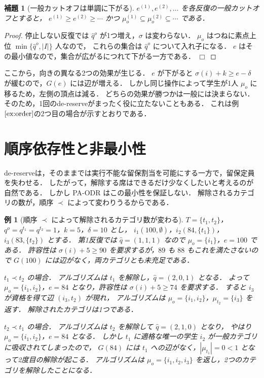\documentclass[
    12pt,          %
    a4paper,       %
    oneside,       %
    onecolumn,     %
    titlepage,     %
    final          %
]{jreport} %
\newcommand{\refexample}[1]{例 $\ref{#1}$}
\newtheorem{example}{例}[chapter]
\newtheorem{lemma}{補題}[chapter]
\newtheorem{proof}{証明}[chapter]
\newcommand{\qed}{\hfill $\Box$ \par}
\begin{document}
\begin{lemma}[一般カットオフは単調に下がる]
\label{lem:monotone}
$e^{(1)},e^{(2)},\dots$ を各反復の一般カットオフとすると，
$e^{(1)}\ge e^{(2)}\ge\cdots$ かつ $\mu_o^{(1)}\subseteq\mu_o^{(2)}\subseteq\cdots$ である．
\end{lemma}

\begin{proof}
停止しない反復では $\hat q^o$ が1つ増え，$\sigma$ は変わらない．
$\mu_o$ はつねに素点上位 $\min\{\hat q^o,|I|\}$ 人なので，
これらの集合は $\hat q^o$ について入れ子になる．
$e$ はその最小値なので，集合が広がるにつれて下がる一方である．
\qed
\end{proof}

ここから，向きの異なる2つの効果が生じる．
$e$ が下がると $\sigma(i)+k\ge e-\delta$ が緩むので，$G(e)$ には辺が増える．
しかし同じ操作によって学生が1人 $\mu_o$ に移るため，左側の頂点は減る．
どちらの効果が勝つかは一般には決まらない．
そのため，1回のde-reserveがまったく役に立たないこともある．
これは\refexample{ex:order}の2つ目の場合が示すとおりである．

\section{順序依存性と非最小性}
\label{sec:order}

de-reserveは，そのままでは実行不能な留保割当を可能にする一方で，留保定員を失わせる．
したがって，解除する席はできるだけ少なくしたいと考えるのが自然である．
しかし PA-ODR はこの最小性を保証しない．
解除されるカテゴリの数が，順序 $\prec$ によって変わりうるからである．

\begin{example}[順序 $\prec$ によって解除されるカテゴリ数が変わる]
\label{ex:order}
$T=\{t_1,t_2\}$，$q^o=q^{t_1}=q^{t_2}=1$，$k=5$，$\delta=10$ とし，
$i_1(100,\emptyset)$，$i_2(84,\{t_1\})$，$i_3(83,\{t_2\})$ とする．
第1反復では $\hat q=(1,1,1)$ なので $\mu_o=\{i_1\}$，$e=100$ である．
許容性は $\sigma(i)+5\ge90$ を要求するが，$89$ も $88$ もこれを満たさないので
$G(100)$ には辺がなく，両カテゴリとも未充足である．

\emph{$t_1\prec t_2$ の場合．}
アルゴリズムは $t_1$ を解除し，$\hat q=(2,0,1)$ となる．
よって $\mu_o=\{i_1,i_2\}$，$e=84$ となり，許容性は $\sigma(i)+5\ge74$ を要求する．
すると $i_3$ が資格を得て辺 $(i_3,t_2)$ が現れ，
アルゴリズムは $\mu_o=\{i_1,i_2\}$，$\mu_{t_2}=\{i_3\}$ を返す．
解除されたカテゴリは1つである．

\emph{$t_2\prec t_1$ の場合．}
アルゴリズムは $t_2$ を解除して $\hat q=(2,1,0)$ となり，
やはり $\mu_o=\{i_1,i_2\}$，$e=84$ となる．
しかし $t_1$ に適格な唯一の学生 $i_2$ が一般カテゴリに吸収されてしまったので，
$G(84)$ には $t_1$ への辺がなく，$|\mu_{t_1}|=0<1$ となって2度目の解除が起こる．
アルゴリズムは $\mu_o=\{i_1,i_2,i_3\}$ を返し，2つのカテゴリを解除したことになる．
\end{example}
\end{document}
